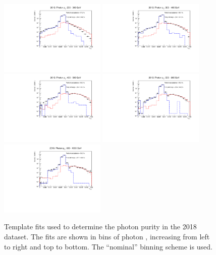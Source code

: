\begin{figure}[htbp]
    \centering
        \includegraphics[width=0.45\textwidth]{PhotonPurity/fit_2018_pt200-300_nominal.pdf}
        \includegraphics[width=0.45\textwidth]{PhotonPurity/fit_2018_pt300-400_nominal.pdf}
        \includegraphics[width=0.45\textwidth]{PhotonPurity/fit_2018_pt400-500_nominal.pdf}
        \includegraphics[width=0.45\textwidth]{PhotonPurity/fit_2018_pt500-600_nominal.pdf}
        \includegraphics[width=0.45\textwidth]{PhotonPurity/fit_2018_pt600-1000_nominal.pdf}
    \caption{Template fits used to determine the photon purity in the 2018 dataset. The fits are shown in bins of photon \pt, increasing from left 
    to right and top to bottom. The ``nominal'' binning scheme is used.}
    \label{fig:purity_fits_2018}
\end{figure}

